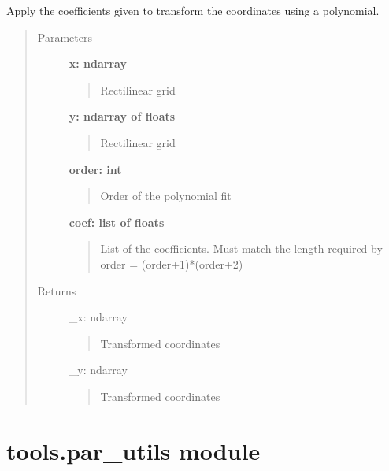 \documentclass[letterpaper,10pt,english]{sphinxmanual}
\begin{document}
\begin{fulllineitems}
\label{tools:tools.locate_psflets.transform}
Apply the coefficients given to transform the coordinates using
a polynomial.
\begin{quote}\begin{description}
\item[{Parameters}] \leavevmode
\textbf{x:     ndarray}
\begin{quote}

Rectilinear grid
\end{quote}

\textbf{y:     ndarray of floats}
\begin{quote}

Rectilinear grid
\end{quote}

\textbf{order: int}
\begin{quote}

Order of the polynomial fit
\end{quote}

\textbf{coef:  list of floats}
\begin{quote}

List of the coefficients.  Must match the length required by
order = (order+1)*(order+2)
\end{quote}

\item[{Returns}] \leavevmode
\_x:    ndarray
\begin{quote}

Transformed coordinates
\end{quote}

\_y:    ndarray
\begin{quote}

Transformed coordinates
\end{quote}

\end{description}\end{quote}

\end{fulllineitems}



\section{tools.par\_utils module}
\label{tools:tools-par-utils-module}\label{tools:module-tools.par_utils}
\end{document}
